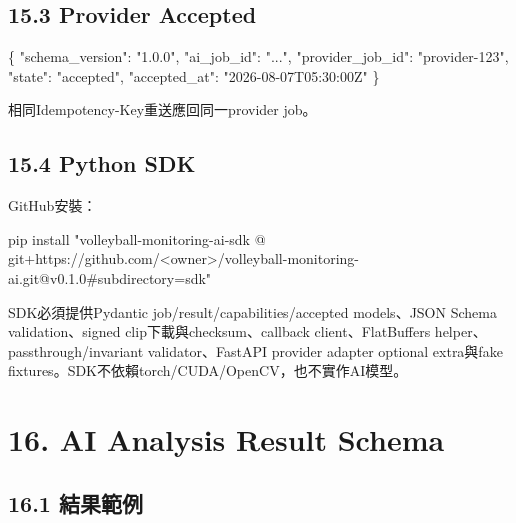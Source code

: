 \documentclass[
  9pt,
  a4paper,
]{article}
\newenvironment{Shaded}{}{}
\newcommand{\DataTypeTok}[1]{\textcolor[rgb]{0.56,0.13,0.00}{#1}}
\newcommand{\ExtensionTok}[1]{#1}
\newcommand{\FunctionTok}[1]{\textcolor[rgb]{0.02,0.16,0.49}{#1}}
\newcommand{\NormalTok}[1]{#1}
\newcommand{\StringTok}[1]{\textcolor[rgb]{0.25,0.44,0.63}{#1}}
\begin{document}
\subsection{15.3 Provider Accepted}\label{153-provider-accepted}

\begin{Shaded}
\begin{Highlighting}[]
\FunctionTok{\{}
  \DataTypeTok{"schema\_\allowbreak{}version"}\FunctionTok{:} \StringTok{"1.0.0"}\FunctionTok{,}
  \DataTypeTok{"ai\_\allowbreak{}job\_\allowbreak{}id"}\FunctionTok{:} \StringTok{"..."}\FunctionTok{,}
  \DataTypeTok{"provider\_\allowbreak{}job\_\allowbreak{}id"}\FunctionTok{:} \StringTok{"provider{-}123"}\FunctionTok{,}
  \DataTypeTok{"state"}\FunctionTok{:} \StringTok{"accepted"}\FunctionTok{,}
  \DataTypeTok{"accepted\_\allowbreak{}at"}\FunctionTok{:} \StringTok{"2026{-}08{-}07T05:30:00Z"}
\FunctionTok{\}}
\end{Highlighting}
\end{Shaded}

相同Idempotency-Key重送應回同一provider job。

\subsection{15.4 Python SDK}\label{154-python-sdk}

GitHub安裝：

\begin{Shaded}
\begin{Highlighting}[]
\ExtensionTok{pip}\NormalTok{ install }\StringTok{"volleyball{-}monitoring{-}ai{-}sdk @ git+https://github.com/\textless{}owner\textgreater{}/volleyball{-}monitoring{-}ai.git@v0.1.0\#subdirectory=sdk"}
\end{Highlighting}
\end{Shaded}

SDK必須提供Pydantic job/result/capabilities/accepted models、JSON Schema
validation、signed clip下載與checksum、callback client、FlatBuffers
helper、passthrough/invariant validator、FastAPI provider adapter
optional extra與fake
fixtures。SDK不依賴torch/CUDA/OpenCV，也不實作AI模型。

\section{16. AI Analysis Result
Schema}\label{16-ai-analysis-result-schema}

\subsection{16.1 結果範例}\label{161-ux7d50ux679cux7bc4ux4f8b}
\end{document}
